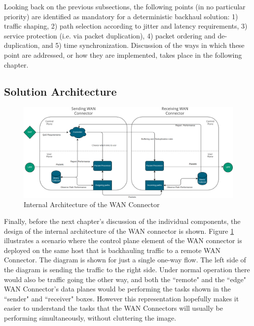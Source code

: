 Looking back on the previous subsections, the following points (in no particular priority) are identified as mandatory for a deterministic backhaul solution: 1) traffic shaping, 2) path selection according to jitter and latency requirements, 3) service protection (i.e. via packet duplication), 4) packet ordering and de-duplication, and 5) time synchronization. Discussion of the ways in which these point are addressed, or how they are implemented, takes place in the following chapter.

\subsection{Solution Architecture}

\begin{figure}[h]
    \centering
        \includegraphics[width=\textwidth]{fig/be-architecture.png}
        \caption{Internal Architecture of the WAN Connector}
        \label{fig:arch}
\end{figure}

Finally, before the next chapter's discussion of the individual components, the design of the internal architecture of the WAN connector is shown. Figure \ref{fig:arch} illustrates a scenario where the control plane element of the WAN connector is deployed on the same host that is backhauling traffic to a remote WAN Connector. The diagram is shown for just a single one-way flow. The left side of the diagram is sending the traffic to the right side. Under normal operation there would also be traffic going the other way, and both the “remote" and the “edge" WAN Connector's data planes would be performing the tasks shown in the “sender" and “receiver" boxes. However this representation hopefully makes it easier to understand the tasks that the WAN Connectors will usually be performing simultaneously, without cluttering the image. 

